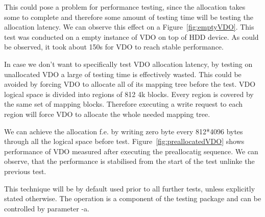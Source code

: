 \documentclass[
  color, %
  table, %
  lof,   %
  lot,   %
]{fithesis3}
\begin{document}
This could pose a problem for performance testing, since the allocation takes some to complete and therefore some amount of testing time will be testing the allocation latency. We can observe this effect on a Figure~\ref{fig:emptyVDO}. This test was conducted on a empty instance of VDO on top of HDD device. As could be observed, it took about 150s for VDO to reach stable performance.

In case we don't want to specifically test VDO allocation latency, by testing on unallocated VDO a large of testing time is effectively wasted. This could be avoided by forcing VDO to allocate all of its mapping tree before the test. VDO logical space is divided into regions of 812 4k blocks. Every region is covered by the same set of mapping blocks. Therefore executing a write request to each region will force VDO to allocate the whole needed mapping tree. 

We can achieve the allocation f.e. by writing zero byte every 812*4096 bytes through all the logical space before test. Figure~\ref{fig:preallocatedVDO} shows performance of VDO measured after executing the preallocatig sequence. We can observe, that the performance is stabilised from the start of the test unlinke the previous test.

This technique will be by default used prior to all further tests, unless explicitly stated otherwise. The operation is a component of the testing package and can be controlled by parameter -a.
\end{document}
